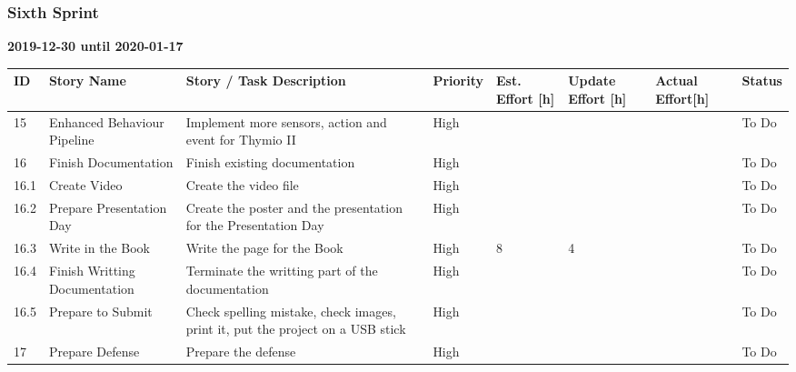 \documentclass{scrartcl}
\begin{document}
\subsubsection{Sixth Sprint}
\textbf{2019-12-30 until 2020-01-17}
\begin{longtable}{p{5mm}|p{2cm}|p{4cm}|p{1cm}|p{1cm}|p{1cm}|p{1cm}|p{15mm}}
  ID                     & Story Name & Story / Task Description & Priority & Est. Effort {[}h{]} & Update Effort {[}h{]} & Actual Effort{[}h{]} & Status                \\ \hline
  15 & Enhanced Behaviour Pipeline & Implement more sensors, action and event for Thymio II & High &  &  &  & To Do \\ 
  16 & Finish Documentation & Finish existing documentation & High &  &  &  & To Do \\
  16.1 & Create Video & Create the video file & High &  &  &  & To Do \\ 
  16.2 & Prepare Presentation Day & Create the poster and the presentation for the Presentation Day & High &  &  &  & To Do \\
  16.3 & Write in the Book & Write the page for the Book & High & 8 & 4 &  & To Do \\ 
  16.4 & Finish Writting Documentation & Terminate the writting part of the documentation & High &  &  &  & To Do \\ 
  16.5 & Prepare to Submit & Check spelling mistake, check images, print it, put the project on a USB stick & High &  &  &  & To Do\\ 
  17 & Prepare Defense & Prepare the defense & High &  &  &  & To Do \\ \hline
\end{longtable}
\end{document}
